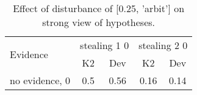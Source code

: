 \begin{table}\begin{tabular}{l|cc|cc}\toprule\multirow{2}{*}{Evidence} & \multicolumn{2}{c}{stealing 1 0}& \multicolumn{2}{c}{stealing 2 0}\\& {K2} & {Dev}& {K2} & {Dev}\\\midrule
no evidence, 0 & \cellcolor{Bittersweet}0.5&\cellcolor{Bittersweet}0.56&0.16&0.14\\\bottomrule\end{tabular}\caption{Effect of disturbance of [0.25, 'arbit'] on strong view of hypotheses.}\end{table}